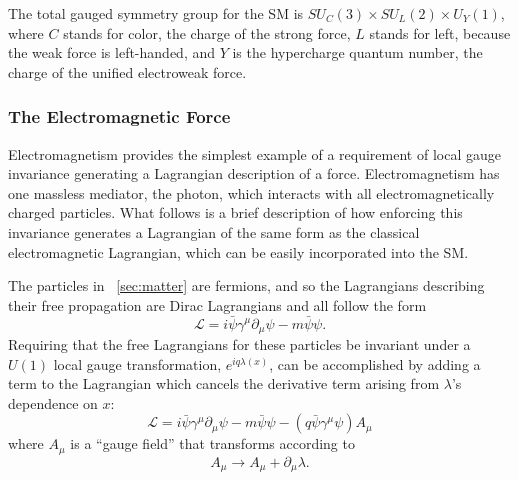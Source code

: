 The total gauged symmetry group for the \ac{SM} is $SU_C(3) \times SU_L(2) \times U_Y(1)$, where $C$ stands for color, the charge of the strong force, $L$ stands for left, because the weak force is left-handed, and $Y$ is the hypercharge quantum number, the charge of the unified electroweak force. 



\subsubsection{The Electromagnetic Force}
\label{sec:em}

Electromagnetism provides the simplest example of a requirement of local gauge invariance generating a Lagrangian description of a force.
Electromagnetism has one massless mediator, the photon, which interacts with all electromagnetically charged particles. What follows is a brief description of how enforcing this invariance generates a Lagrangian of the same form as the classical electromagnetic Lagrangian, which can be easily incorporated into the \ac{SM}. 

The particles in ~\autoref{sec:matter} are fermions, and so the Lagrangians describing their free propagation are Dirac Lagrangians and all follow the form
\begin{equation}
\mathcal{L} = i\bar{\psi}\gamma^\mu \partial_\mu\psi - m \bar{\psi}\psi . 
\end{equation}
Requiring that the free Lagrangians for these particles be invariant under a $U(1)$ local gauge transformation, $e^{iq\lambda(x)}$, can be accomplished by adding a term to the Lagrangian which cancels the derivative term arising from $\lambda$'s dependence on $x$: 
\begin{equation}
\mathcal{L} = i\bar{\psi}\gamma^\mu \partial_\mu\psi - m \bar{\psi}\psi - (q\bar{\psi}\gamma^\mu\psi)A_\mu
\end{equation}
where $A_\mu$ is a ``gauge field'' that transforms according to 
\begin{equation}
A_\mu \rightarrow A_\mu + \partial_\mu \lambda . 
\end{equation}

